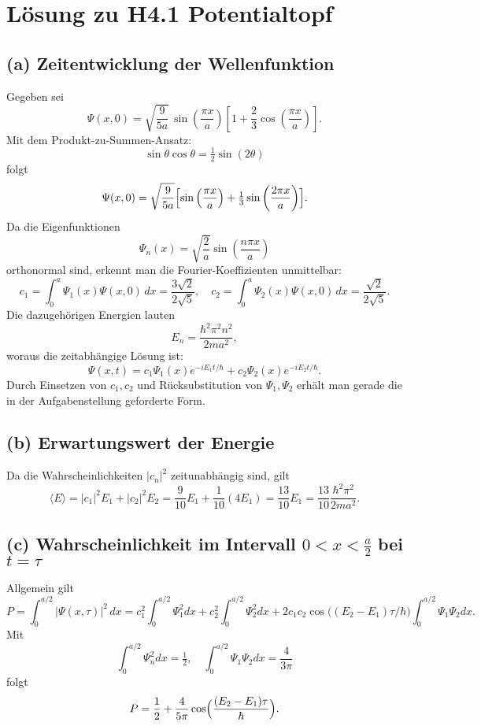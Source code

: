 \documentclass[a4paper,11pt]{article}
\begin{document}
\section*{Lösung zu H4.1 Potentialtopf}

\subsection*{(a) Zeitentwicklung der Wellenfunktion}
Gegeben sei
\[
\Psi(x,0)=\sqrt{\frac{9}{5a}}\,\sin\left(\frac{\pi x}{a}\right)\left[1+\frac{2}{3}\cos\left(\frac{\pi x}{a}\right)\right].
\]
Mit dem Produkt-zu-Summen-Ansatz:
\[
\sin\theta\cos\theta=\tfrac12\sin(2\theta)
\]
folgt
\[
\Psi(x,0)=\sqrt{\frac{9}{5a}}\Bigl[\sin\left(\frac{\pi x}{a}\right)+\tfrac{1}{3}\sin\left(\frac{2\pi x}{a}\right)\Bigr].
\]
Da die Eigenfunktionen
\[
\Psi_n(x)=\sqrt{\frac{2}{a}}\sin\left(\frac{n\pi x}{a}\right)
\]
orthonormal sind, erkennt man die Fourier-Koeffizienten unmittelbar:
\[
c_1=\int_0^a\Psi_1(x)\Psi(x,0)\,dx=\frac{3\sqrt{2}}{2\sqrt{5}},
\quad
c_2=\int_0^a\Psi_2(x)\Psi(x,0)\,dx=\frac{\sqrt{2}}{2\sqrt{5}}.
\]
Die dazugehörigen Energien lauten
\[
E_n=\frac{\hbar^2\pi^2n^2}{2ma^2},
\]
woraus die zeitabhängige Lösung ist:
\[
\Psi(x,t)=c_1\Psi_1(x)e^{-iE_1t/\hbar}+c_2\Psi_2(x)e^{-iE_2t/\hbar}.
\]
Durch Einsetzen von $c_1,c_2$ und Rücksubstitution von $\Psi_1,\Psi_2$ erhält man gerade die in der Aufgabenstellung geforderte Form.

\subsection*{(b) Erwartungswert der Energie}
Da die Wahrscheinlichkeiten $|c_n|^2$ zeitunabhängig sind, gilt
\[
\langle E\rangle=|c_1|^2E_1+|c_2|^2E_2
=\frac{9}{10}E_1+\frac{1}{10}(4E_1)
=\frac{13}{10}E_1
=\frac{13}{10}\frac{\hbar^2\pi^2}{2ma^2}.
\]

\subsection*{(c) Wahrscheinlichkeit im Intervall $0<x<\tfrac{a}{2}$ bei $t=\tau$}
Allgemein gilt
\[
P=\int_0^{a/2}|\Psi(x,\tau)|^2\,dx
=c_1^2\int_0^{a/2}\Psi_1^2dx+c_2^2\int_0^{a/2}\Psi_2^2dx
+2c_1c_2\cos\bigl((E_2-E_1)\tau/\hbar\bigr)\int_0^{a/2}\Psi_1\Psi_2dx.
\]
Mit
\[
\int_0^{a/2}\Psi_n^2dx=\tfrac12,
\quad
\int_0^{a/2}\Psi_1\Psi_2dx=\frac{4}{3\pi}
\]
folgt
\[
P=\frac12+\frac{4}{5\pi}\cos\Bigl(\frac{(E_2-E_1)\tau}{\hbar}\Bigr).
\]
\end{document}
